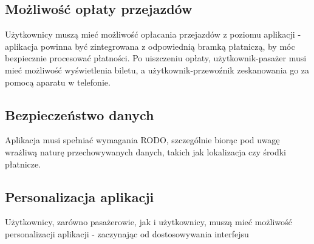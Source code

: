 \subsection{Możliwość opłaty przejazdów}
Użytkownicy muszą mieć możliwość opłacania przejazdów z poziomu aplikacji - aplikacja powinna być zintegrowana z odpowiednią bramką płatniczą, by móc bezpiecznie procesować płatności. Po uiszczeniu opłaty, użytkownik-pasażer musi mieć możliwość wyświetlenia biletu, a użytkownik-przewoźnik zeskanowania go za pomocą aparatu w telefonie.

\subsection{Bezpieczeństwo danych}
Aplikacja musi spełniać wymagania RODO, szczególnie biorąc pod uwagę wrażliwą naturę przechowywanych danych, takich jak lokalizacja czy środki płatnicze.

\subsection{Personalizacja aplikacji}
Użytkownicy, zarówno pasażerowie, jak i użytkownicy, muszą mieć możliwość personalizacji aplikacji - zaczynając od dostosowywania interfejsu 